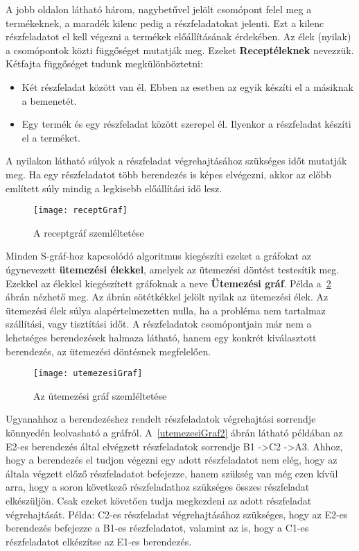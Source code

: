 A jobb oldalon látható három, nagybetűvel jelölt csomópont felel meg a termékeknek, a maradék kilenc pedig a részfeladatokat jelenti. Ezt a kilenc részfeladatot el kell végezni a termékek előállításának érdekében. Az élek (nyilak) a csomópontok közti függőséget mutatják meg. Ezeket \textbf{Receptéleknek} nevezzük. Kétfajta függőséget tudunk megkülönböztetni:
\begin{itemize}
  \item Két részfeladat között van él. Ebben az esetben az egyik készíti el a másiknak a bemenetét.
  \item Egy termék és egy részfeladat között szerepel él. Ilyenkor a részfeladat készíti el a terméket.
\end{itemize}
A nyilakon látható súlyok a részfeladat végrehajtásához szükséges időt mutatják meg. Ha egy részfeladatot több berendezés is képes elvégezni, akkor az előbb említett súly mindig a legkisebb előállítási idő lesz.
\begin{figure}[H]	
\begin{center}
\texttt{[image: receptGraf]}
\caption{A receptgráf szemléltetése}
\label{receptGraf}
\end{center}
\end{figure}
Minden S-gráf-hoz kapcsolódó algoritmus kiegészíti ezeket a gráfokat az úgynevezett \textbf{ütemezési élekkel}, amelyek az ütemezési döntést testesítik meg. Ezekkel az élekkel kiegészített gráfoknak a neve \textbf{Ütemezési gráf}. Példa a~\ref{utemezesiGraf} ábrán nézhető meg. Az ábrán sötétkékkel jelölt nyilak az ütemezési élek. Az ütemezési élek súlya alapértelmezetten nulla, ha a probléma nem tartalmaz szállítási, vagy tisztítási időt. A részfeladatok csomópontjain már nem a lehetséges berendezések halmaza látható, hanem egy konkrét kiválasztott berendezés, az ütemezési döntésnek megfelelően. 
\begin{figure}[H]
\begin{center}
\texttt{[image: utemezesiGraf]}
\caption{Az ütemezési gráf szemléltetése}
\label{utemezesiGraf}
\end{center}
\end{figure}
Ugyanahhoz a berendezéshez rendelt részfeladatok végrehajtási sorrendje könnyedén leolvasható a gráfról. A~\ref{utemezesiGraf2} ábrán látható példában az E2-es berendezés által elvégzett részfeladatok sorrendje B1 -\textgreater  C2 -\textgreater  A3. Ahhoz, hogy a berendezés el tudjon végezni egy adott részfeladatot nem elég, hogy az általa végzett előző részfeladatot befejezze, hanem szükség van még ezen kívül arra, hogy a soron következő részfeladathoz szükséges összes részfeladat elkészüljön. Csak ezeket követően tudja megkezdeni az adott részfeladat végrehajtását. Példa: C2-es részfeladat végrehajtásához szükséges, hogy az E2-es berendezés befejezze a B1-es részfeladatot, valamint az is, hogy a C1-es részfeladatot elkészítse az E1-es berendezés.
